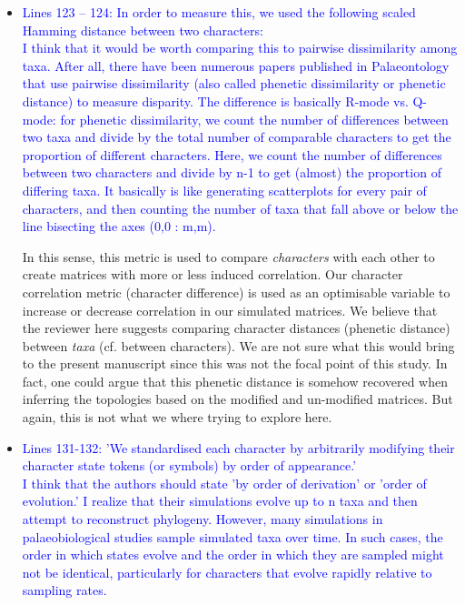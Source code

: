 \documentclass[12pt,letterpaper]{article}
\begin{document}
\begin{itemize}
\item{\textcolor{blue}{Lines 123 – 124: In order to measure this, we used the following scaled Hamming distance between two characters:
\\
I think that it would be worth comparing this to pairwise dissimilarity among taxa. After all, there have been numerous papers published in Palaeontology that use pairwise dissimilarity (also called phenetic dissimilarity or phenetic distance) to measure disparity. The difference is basically R-mode vs. Q-mode: for phenetic dissimilarity, we count the number of differences between two taxa and divide by the total number of comparable characters to get the proportion of different characters. Here, we count the number of differences between two characters and divide by n-1 to get (almost) the proportion of differing taxa. It basically is like generating scatterplots for every pair of characters, and then counting the number of taxa that fall above or below the line bisecting the axes (0,0 : m,m).}}

In this sense, this metric is used to compare \textit{characters} with each other to create matrices with more or less induced correlation. Our character correlation metric (character difference) is used as an optimisable variable to increase or decrease correlation in our simulated matrices. We believe that the reviewer here suggests comparing character distances (phenetic distance) between \textit{taxa} (cf. between characters). We are not sure what this would bring to the present manuscript since this was not the focal point of this study. In fact, one could argue that this phenetic distance is somehow recovered when inferring the topologies based on the modified and un-modified matrices. But again, this is not what we where trying to explore here.




\item{\textcolor{blue}{Lines 131-132: 'We standardised each character by arbitrarily modifying their character state tokens (or symbols) by order of appearance.'
\\
I think that the authors should state 'by order of derivation' or 'order of evolution.' I realize that their simulations evolve up to n taxa and then attempt to reconstruct phylogeny. However, many simulations in palaeobiological studies sample simulated taxa over time. In such cases, the order in which states evolve and the order in which they are sampled might not be identical, particularly for characters that evolve rapidly relative to sampling rates.}}


\end{itemize}
\end{document}
